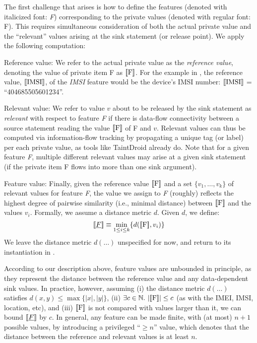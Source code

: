 The first challenge that arises is how to define the features (denoted with italicized font: \emph{F}) corresponding to the private values (denoted with regular font: F). This requires simultaneous consideration of both the actual private value and the ``relevant'' values arising at the sink statement (or release point).
We apply the following computation:
\begin{compactenum}
	\item Reference value: We refer to the actual private value as the \emph{reference value}, denoting the value of private item F as $\lbrack\!\lbrack \text{F} \rbrack\!\rbrack$. For the example in , the reference value, $\lbrack\!\lbrack \text{IMSI} \rbrack\!\rbrack$, of the \emph{IMSI} feature would be the 
	device's IMSI 
	number: $\lbrack\!\lbrack \text{IMSI} \rbrack\!\rbrack$ = ``404685505601234''.
	\item Relevant value: We refer to value $v$ about to be released by the sink statement as \emph{relevant} with respect to feature \emph{F} if there is data-flow connectivity between a source statement reading the value $\lbrack\!\lbrack \text{F} \rbrack\!\rbrack$ of F and $v$. 
	Relevant values can thus be computed via information-flow tracking by propagating a unique tag (or label) per each private value, as tools like TaintDroid already do. Note that for a given feature \emph{F}, multiple different relevant values may arise
	at a given sink statement (if the private item F flows into more than one sink argument).
	\item Feature value: Finally, given the reference value $\lbrack\!\lbrack \text{F} \rbrack\!\rbrack$ and a set $\{ v_1,\ldots,v_k \}$ of relevant values for feature \emph{F}, the value we assign to \emph{F} (roughly) reflects the highest degree of pairwise similarity (i.e., minimal distance) between 
	$\lbrack\!\lbrack \text{F} \rbrack\!\rbrack$ and the values $v_i$. Formally, we assume a distance metric $d$. Given $d$, we define:
	$$
		\lbrack\!\lbrack \emph{F} \rbrack\!\rbrack \equiv \min_{1 \leq i \leq k} \{ d(\lbrack\!\lbrack \text{F} \rbrack\!\rbrack,v_i) \}
	$$
	We leave the distance metric $d(\ldots)$ unspecified for now, and return to its instantiation in .
\end{compactenum}

According to our description above, feature values are unbounded in principle, as they represent the distance between the reference value and any data-dependent sink values. In practice, however, assuming (i) the distance metric $d(\ldots)$ satisfies $d(x,y) \leq \max \{ |x|,|y| \}$, (ii) $\exists c \in \mathbb{N}.\ | \lbrack\!\lbrack \text{F} \rbrack\!\rbrack | \leq c$ (as with the IMEI, IMSI, location, etc), and (iii) $\lbrack\!\lbrack \text{F} \rbrack\!\rbrack$ is not compared with values larger than it, we can bound $\lbrack\!\lbrack \emph{F} \rbrack\!\rbrack$ by $c$. In general, any feature can be made finite, with (at most) $n+1$ possible values, by introducing a privileged ``$\geq n$'' value, which denotes that the distance between the reference and relevant values is at least $n$.

